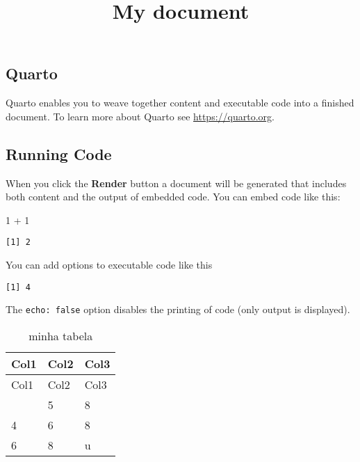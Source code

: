 \documentclass[
  letterpaper,
  12pt,
  oneside,
  a4paper,
  chapter=TITLE,
  english,brazil]{abntex2}
\title{My document}
\author{}
\date{}
\newenvironment{Shaded}{\begin{snugshade}}{\end{snugshade}}
\newcommand{\DecValTok}[1]{\textcolor[rgb]{0.68,0.00,0.00}{#1}}
\newcommand{\SpecialCharTok}[1]{\textcolor[rgb]{0.37,0.37,0.37}{#1}}
\begin{document}
\maketitle

\subsection{Quarto}\label{quarto}

Quarto enables you to weave together content and executable code into a
finished document. To learn more about Quarto see
\url{https://quarto.org}.

\subsection{Running Code}\label{running-code}

When you click the \textbf{Render} button a document will be generated
that includes both content and the output of embedded code. You can
embed code like this:

\begin{Shaded}
\begin{Highlighting}[]
\DecValTok{1} \SpecialCharTok{+} \DecValTok{1}
\end{Highlighting}
\end{Shaded}

\begin{verbatim}
[1] 2
\end{verbatim}

You can add options to executable code like this

\begin{verbatim}
[1] 4
\end{verbatim}

The \texttt{echo:\ false} option disables the printing of code (only
output is displayed).

\begin{longtable}[]{@{}lll@{}}
\caption{minha tabela}\tabularnewline
\toprule\noalign{}
Col1 & Col2 & Col3 \\
\midrule\noalign{}
\endfirsthead
\toprule\noalign{}
Col1 & Col2 & Col3 \\
\midrule\noalign{}
\endhead
\bottomrule\noalign{}
\endlastfoot
1 & 5 & 8 \\
4 & 6 & 8 \\
6 & 8 & u \\
\end{longtable}
\end{document}
